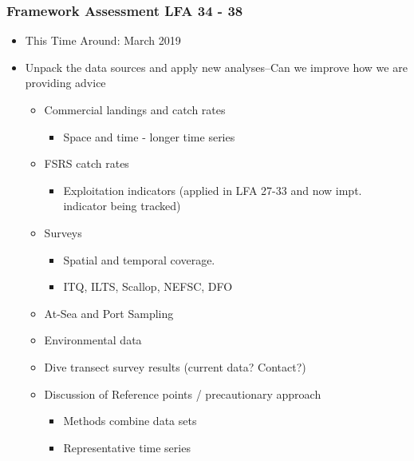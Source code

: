 \documentclass{beamer}
\begin{document}
\begin{frame}
	\frametitle{Framework Assessment LFA 34 - 38}

	\begin{itemize}
		\item This Time Around: March 2019 
		\item Unpack the data sources and apply new analyses--Can we improve how we are providing advice
			\begin{itemize}
				\item Commercial landings and catch rates 
					\begin{itemize}
						\item Space and time - longer time series
					\end{itemize}	
				\item FSRS catch rates
					\begin{itemize}
						\item Exploitation indicators (applied in LFA 27-33 and now impt. indicator being tracked)
					\end{itemize}	
				\item Surveys
					\begin{itemize}
						\item Spatial and temporal coverage. 
						\item ITQ, ILTS, Scallop, NEFSC, DFO
					\end{itemize}
				\item At-Sea and Port Sampling
				\item Environmental data
				\item Dive transect survey results (current data? Contact?)
				\item Discussion of Reference points / precautionary approach
				\begin{itemize}
					\item Methods combine data sets
					\item Representative time series
				\end{itemize}
			\end{itemize}
	\end{itemize}
\end{frame}
\end{document}
